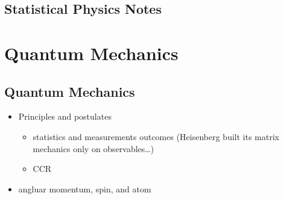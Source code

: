\documentclass[letterpaper,10pt,english]{jupyterBook}
\begin{document}
\chapter{Statistical Physics \sphinxhyphen{} Notes}
\label{\detokenize{ch/statistical-mechanics/notes:statistical-physics-notes}}\label{\detokenize{ch/statistical-mechanics/notes:statistical-mechanics-notes}}\label{\detokenize{ch/statistical-mechanics/notes::doc}}
\sphinxstepscope


\part{Quantum Mechanics}

\sphinxstepscope


\chapter{Quantum Mechanics}
\label{\detokenize{ch/quantum-mechanics/intro:quantum-mechanics}}\label{\detokenize{ch/quantum-mechanics/intro:quantum-mechanics-intro}}\label{\detokenize{ch/quantum-mechanics/intro::doc}}\begin{itemize}
\item {} 
\sphinxAtStartPar
Principles and postulates
\begin{itemize}
\item {} 
\sphinxAtStartPar
statistics and measurements outcomes (Heisenberg built its matrix mechanics only on observables…)

\item {} 
\sphinxAtStartPar
CCR

\end{itemize}

\item {} 
\sphinxAtStartPar
angluar momentum, spin, and atom

\end{itemize}
\end{document}

